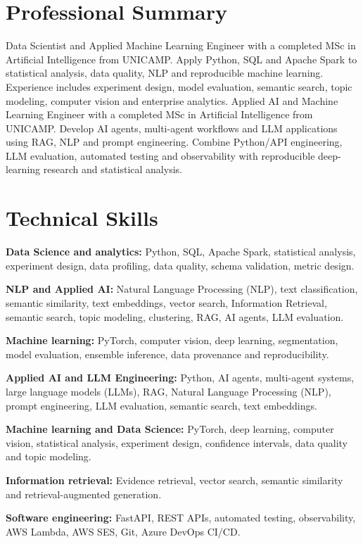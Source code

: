 \section{Professional Summary}
\ifdatascience
Data Scientist and Applied Machine Learning Engineer with a completed MSc in Artificial Intelligence from UNICAMP. Apply Python, SQL and Apache Spark to statistical analysis, data quality, NLP and reproducible machine learning. Experience includes experiment design, model evaluation, semantic search, topic modeling, computer vision and enterprise analytics.
\else
Applied AI and Machine Learning Engineer with a completed MSc in Artificial Intelligence from UNICAMP. Develop AI agents, multi-agent workflows and LLM applications using RAG, NLP and prompt engineering. Combine Python/API engineering, LLM evaluation, automated testing and observability with reproducible deep-learning research and statistical analysis.
\fi

\section{Technical Skills}
\ifdatascience
\textbf{Data Science and analytics:} Python, SQL, Apache Spark, statistical analysis, experiment design, data profiling, data quality, schema validation, metric design.\par
\textbf{NLP and Applied AI:} Natural Language Processing (NLP), text classification, semantic similarity, text embeddings, vector search, Information Retrieval, semantic search, topic modeling, clustering, RAG, AI agents, LLM evaluation.\par
\textbf{Machine learning:} PyTorch, computer vision, deep learning, segmentation, model evaluation, ensemble inference, data provenance and reproducibility.\par
\else
\textbf{Applied AI and LLM Engineering:} Python, AI agents, multi-agent systems, large language models (LLMs), RAG, Natural Language Processing (NLP), prompt engineering, LLM evaluation, semantic search, text embeddings.\par
\textbf{Machine learning and Data Science:} PyTorch, deep learning, computer vision, statistical analysis, experiment design, confidence intervals, data quality and topic modeling.\par
\textbf{Information retrieval:} Evidence retrieval, vector search, semantic similarity and retrieval-augmented generation.\par
\fi
\textbf{Software engineering:} FastAPI, REST APIs, automated testing, observability, AWS Lambda, AWS SES, Git, Azure DevOps CI/CD.\par

